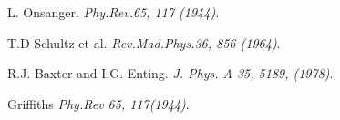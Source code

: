 
\cleardoublepage
{}
\begin{thebibliography}{99}

L. Onsanger.
\textit{Phy.Rev.65, 117 (1944)}. 

T.D Schultz et al.
\textit{Rev.Mad.Phys.36, 856 (1964)}. 

R.J. Baxter and I.G. Enting.
\textit{J. Phys. A 35, 5189, (1978)}. 


Griffiths
\textit{Phy.Rev 65, 117(1944)}. 

%

\end{thebibliography}